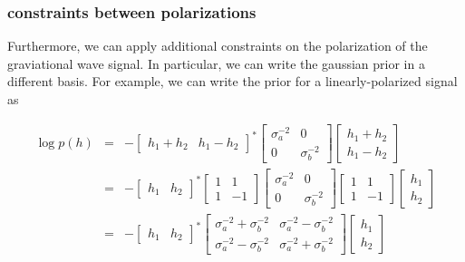 \documentclass[10pt]{article}
\begin{document}
\subsubsection{constraints between polarizations}

Furthermore, we can apply additional constraints on the polarization of the graviational wave signal. In particular, we can write the gaussian prior in a different basis. For example, we can write the prior for a linearly-polarized signal as

\begin{eqnarray}
\log p(h) & = & - \begin{bmatrix} h_1+h_2 & h_1-h_2 \end{bmatrix}^\ast \begin{bmatrix} \sigma_a^{-2} & 0 \\ 0 & \sigma_b^{-2} \end{bmatrix} \begin{bmatrix} h_1+h_2 \\ h_1-h_2 \end{bmatrix} \\
          & = & - \begin{bmatrix} h_1 & h_2 \end{bmatrix}^\ast \begin{bmatrix} 1 & 1 \\ 1 & -1 \end{bmatrix} \begin{bmatrix} \sigma_a^{-2} & 0 \\ 0 & \sigma_b^{-2} \end{bmatrix} \begin{bmatrix} 1 & 1 \\ 1 & -1 \end{bmatrix} \begin{bmatrix} h_1 \\ h_2 \end{bmatrix} \\
          & = & - \begin{bmatrix} h_1 & h_2 \end{bmatrix}^\ast \begin{bmatrix} \sigma_a^{-2}+\sigma_b^{-2} & \sigma_a^{-2}-\sigma_b^{-2} \\ \sigma_a^{-2}-\sigma_b^{-2}  & \sigma_a^{-2}+\sigma_b^{-2}  \end{bmatrix} \begin{bmatrix} h_1 \\ h_2 \end{bmatrix} \\
\end{eqnarray}
\end{document}
